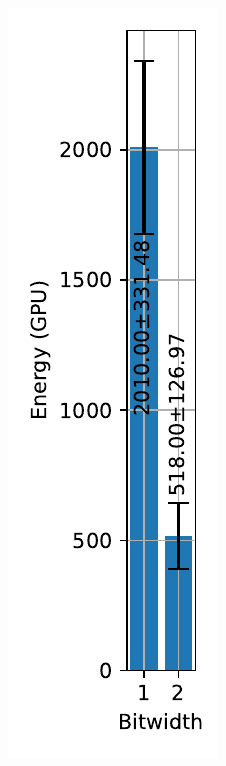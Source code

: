         \begin{figure}[H]
            \centering
            \begin{subfigure}[H]{0.48\textwidth}
                \includegraphics[width=\textwidth]{../timesteps/FashionMNIST/plots/fashionmnist_train_energy_gpu.pdf}

\end{subfigure}
\end{figure}
